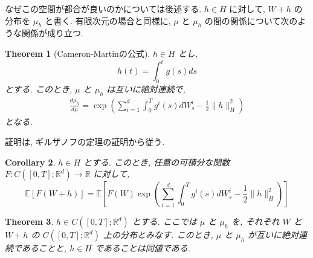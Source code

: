 \documentclass[11pt]{article}
\theoremstyle{breakstyle}
\newtheorem{theorem}{Theorem}[section]
\newtheorem{corollary}[theorem]{Corollary}
\begin{document}
なぜこの空間が都合が良いのかについては後述する. $h\in H$ に対して, $W+h$ の分布を $\mu_h$ と書く. 
有限次元の場合と同様に, $\mu$ と $\mu_h$ の間の関係について次のような関係が成り立つ.
\begin{theorem}[Cameron-Martinの公式]
    \label{thm:cameron-martin-formula}
    $h\in H$ とし, 
    \begin{equation*}
        h(t)=\int_{0}^{t}g(s)ds
    \end{equation*}
    とする. このとき, $\mu$ と $\mu_h$ は互いに絶対連続で, 
    \begin{align*}
        \frac{d\mu_h}{d\mu}=\exp\left(\sum_{i=1}^{d}\int_{0}^{T}g^i(s)dW^i_s-\frac{1}{2}\|h\|^2_H\right)
    \end{align*}
    となる.
\end{theorem}
証明は, ギルザノフの定理の証明から従う.
\begin{corollary}
    $h\in H$ とする. このとき, 任意の可積分な関数 $F: C([0,T];\mathbb{R}^d)\rightarrow \mathbb{R}$ に対して, 
    \begin{equation*}
        \mathbb{E}\left[F(W+h)\right]=\mathbb{E}\left[F(W)\exp\left(\sum_{i=1}^{d}\int_{0}^{T}g^i(s)dW^i_s-\frac{1}{2}\|h\|^2_H\right)\right]
    \end{equation*}
\end{corollary}
\begin{theorem}
    \label{thm:cameron-martin-characterization}
    $h\in C([0,T];\mathbb{R}^d)$ とする. ここでは $\mu$ と $\mu_h$ を,
    それぞれ $W$ と $W+h$ の $C([0,T];\mathbb{R}^d)$ 上の分布とみなす.
    このとき, $\mu$ と $\mu_h$ が互いに絶対連続であることと, $h\in H$ であることは同値である.
\end{theorem}
\end{document}
